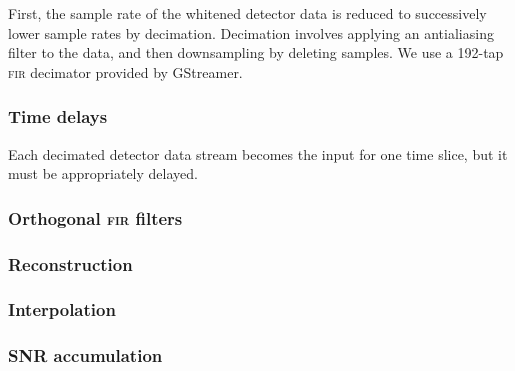 First, the sample rate of the whitened detector data is reduced to successively lower sample rates by decimation.  Decimation involves applying an antialiasing filter to the data, and then downsampling by deleting samples.  We use a 192-tap \textsc{fir} decimator provided by GStreamer.

\subsubsection{Time delays}

Each decimated detector data stream becomes the input for one time slice, but it must be appropriately delayed.

\subsubsection{Orthogonal \textsc{fir} filters}

\subsubsection{Reconstruction}

\subsubsection{Interpolation}

\subsubsection{SNR accumulation}

